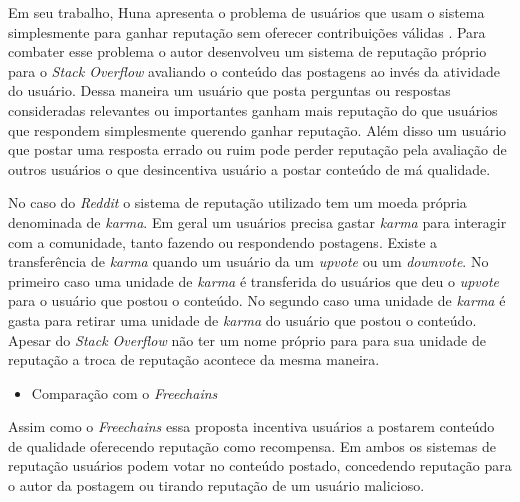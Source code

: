 \documentclass[12pt]{article}
\newcommand{\FC} {\textit{Freechains}\xspace}
\begin{document}
Em seu trabalho, Huna apresenta o problema de usuários que usam o sistema simplesmente para ganhar reputação sem oferecer contribuições válidas \cite{huna2016exploiting}.
Para combater esse problema o autor desenvolveu um sistema de reputação próprio para o \textit{Stack Overflow} avaliando o conteúdo das postagens ao invés da atividade do usuário. 
Dessa maneira um usuário que posta perguntas ou respostas consideradas relevantes ou importantes ganham mais reputação do que usuários que respondem simplesmente querendo ganhar reputação. 
Além disso um usuário que postar uma resposta errado ou ruim pode perder reputação pela avaliação de outros usuários o que desincentiva usuário a postar conteúdo de má qualidade. 

No caso do \textit{Reddit} o sistema de reputação utilizado tem um moeda própria denominada de \textit{karma}.
Em geral um usuários precisa gastar \textit{karma} para interagir com a comunidade, tanto fazendo ou respondendo postagens.
Existe a transferência de \textit{karma} quando um usuário da um \textit{upvote} ou um \textit{downvote}.
No primeiro caso uma unidade de \textit{karma} é transferida do usuários que deu o \textit{upvote} para o usuário que postou o conteúdo.
No segundo caso uma unidade de \textit{karma} é gasta para retirar uma unidade de \textit{karma} do usuário que postou o conteúdo.
Apesar do \textit{Stack Overflow} não ter um nome próprio para para sua unidade de reputação a troca de reputação acontece da mesma maneira.

\begin{itemize}
    \item Comparação com o \FC
\end{itemize}

Assim como o \FC essa proposta incentiva usuários a postarem conteúdo de qualidade oferecendo reputação como recompensa. 
Em ambos os sistemas de reputação usuários podem votar no conteúdo postado, concedendo reputação para o autor da postagem ou tirando reputação de um usuário malicioso. 
\end{document}
